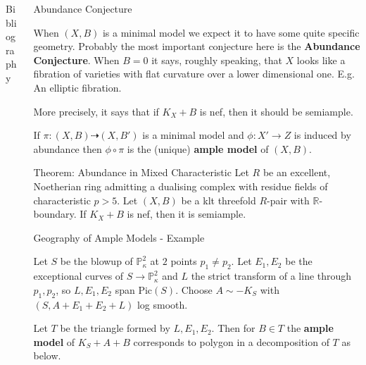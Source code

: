 \documentclass[final]{beamer}
\begin{document}
\begin{frame}[t, fragile]
\begin{columns}[t]
\begin{column}{0.14\paperwidth}
			
			\begin{block}{Bibliography}
				\printbibliography
			\end{block}
			
		\end{column}
		
		
		\begin{column}{0.36\paperwidth}
			
			\begin{block}{Abundance Conjecture}
				
				When $(X,B)$ is a minimal model we expect it to have some quite specific geometry. Probably the most important conjecture here is the \textbf{Abundance Conjecture}. When $B=0$ it says, roughly speaking, that $X$ looks like a fibration of varieties with flat curvature over a lower dimensional one. E.g. An elliptic fibration. 
				
				More precisely, it says that if $K_X+B$ is nef, then it should be semiample.
				
				If $\pi:(X,B) \dashrightarrow (X,B')$ is a minimal model and $\phi: X' \to Z$ is induced by abundance then $\phi \circ \pi $ is the (unique) \textbf{ample model} of $(X,B)$.
			\end{block}  
			
			\begin{alertblock}{Theorem: Abundance in Mixed Characteristic \cite{sbb2021}}
				Let $R$ be an excellent, Noetherian ring admitting a dualising complex with residue fields of characteristic $p > 5$.
				Let $(X,B)$ be a klt threefold $R$-pair with $\mathbb{R}$-boundary. If $K_X+B$ is nef, then it is semiample.
			\end{alertblock}  
			
			\begin{block}{Geography of Ample Models - Example}
				
				Let $S$ be the blowup of $\mathbb{P}^{2}_{\kappa}$ at $2$ points $p_{1} \neq p_{2}$. Let $E_{1},E_{2}$ be the exceptional curves of $S \to \mathbb{P}^{2}_{\kappa}$ and $L$ the strict transform of a line through $p_{1}, p_{2}$, so $L,E_{1},E_{2}$ span $\text{Pic}(S)$. Choose $A \sim -K_{S}$ with $(S,A+E_{1}+E_{2}+L)$ log smooth. 
				
				Let $T$ be the triangle formed by $L,E_{1},E_{2}$. Then for $B \in T$ the \textbf{ample model} of $K_{S}+A+B$ corresponds to polygon in a decomposition of $T$ as below.
				
				\begin{center}
					

\end{center}
\end{block}
\end{column}
\end{columns}
\end{frame}
\end{document}
